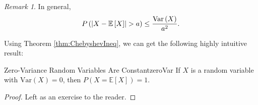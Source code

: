 \documentclass[math]{amznotes}
\theoremstyle{remark}
\newtheorem*{remark}{Remark}
\newcommand{\0}{\mathbf{0}}
\newcommand{\1}{\mathbf{1}}
\begin{document}
\begin{notebox}
    \begin{remark}
        In general, 
        \begin{equation*}
            P\left({\left\lvert {X - \mathbb{E}\left[X\right]} \right\rvert} > a\right) \leq \frac{\mathrm{Var}\left(X\right)}{a^2}.
        \end{equation*}
    \end{remark}
\end{notebox}
Using Theorem \ref{thm:ChebyshevIneq}, we can get the following highly intuitive result:
\begin{corbox}{Zero-Variance Random Variables Are Constant}{zeroVar}
    If $X$ is a random variable with $\mathrm{Var}(X) = 0$, then $P(X = \mathbb{E}[X]) = 1$.
    \tcblower
    \begin{proof}
        Left as an exercise to the reader.
    \end{proof}
\end{corbox}
\end{document}
